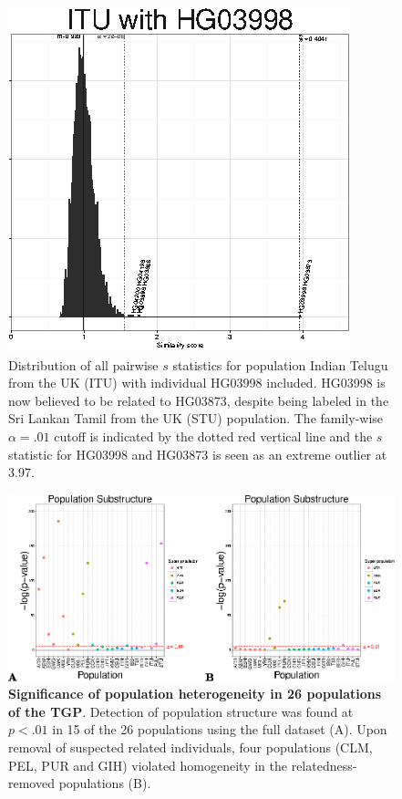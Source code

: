 \begin{figure}
\includegraphics[width=1\columnwidth]{./figures/figure2_bw.eps}\caption[$s$ statistics for population Indian
Telugu from the UK with HG03998]{Distribution of all pairwise $s$ statistics for population Indian
Telugu from the UK (ITU) with individual HG03998 included. HG03998
is now believed to be related to HG03873, despite being labeled in
the Sri Lankan Tamil from the UK (STU) population. The family-wise
$\alpha=.01$ cutoff is indicated by the dotted red vertical line
and the $s$ statistic for HG03998 and HG03873 is seen as an extreme
outlier at 3.97.}
\label{fig: ITU with HG03998}
\end{figure}

\begin{figure}
\includegraphics[width=1\columnwidth]{./figures/figure3.eps}
\caption[Significance of population heterogeneity in 26 populations
of the TGP]{\textbf{Significance of population heterogeneity in 26 populations
of the TGP}. Detection of population structure was found at $p<.01$
in 15 of the 26 populations using the full dataset (A). Upon removal
of suspected related individuals, four populations (CLM, PEL, PUR
and GIH) violated homogeneity in the relatedness-removed populations
(B).}
\label{fig: Structure pvals}
\end{figure}



